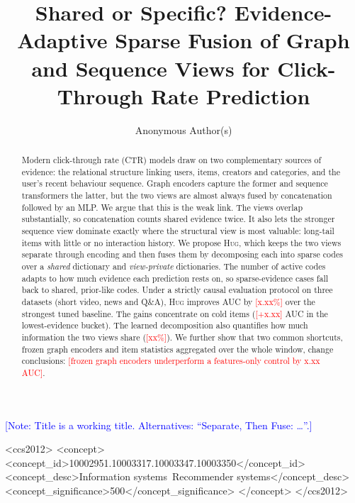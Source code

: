\documentclass[sigconf,anonymous,review]{acmart}
\newif\ifshownotes \shownotestrue
\newcommand{\tbd}[1]{\textcolor{red}{[#1]}}
\newcommand{\note}[1]{\ifshownotes\textcolor{blue}{[Note: #1]}\fi}
\newcommand{\method}{\textsc{Hug}}      %
\begin{document}
\title{Shared or Specific? Evidence-Adaptive Sparse Fusion of Graph and Sequence Views for Click-Through Rate Prediction}
\note{Title is a working title. Alternatives: ``Separate, Then Fuse: \dots''.}

\author{Anonymous Author(s)}

\begin{abstract}
Modern click-through rate (CTR) models draw on two complementary sources of
evidence: the relational structure linking users, items, creators and
categories, and the user's recent behaviour sequence. Graph encoders capture
the former and sequence transformers the latter, but the two views are almost
always fused by concatenation followed by an MLP. We argue that this is the
weak link. The views overlap substantially, so concatenation counts shared
evidence twice. It also lets the stronger sequence view dominate exactly
where the structural view is most valuable: long-tail items with little or no
interaction history. We propose \method{}, which keeps the two views separate
through encoding and then fuses them by decomposing each into sparse codes
over a \emph{shared} dictionary and \emph{view-private} dictionaries. The
number of active codes adapts to how much evidence each prediction rests on,
so sparse-evidence cases fall back to shared, prior-like codes. Under a
strictly causal evaluation protocol on three datasets (short video, news and
Q\&A), \method{} improves AUC by \tbd{x.xx\%} over the strongest tuned
baseline. The gains concentrate on cold items (\tbd{+x.xx} AUC in the
lowest-evidence bucket). The learned decomposition also quantifies how much
information the two views share (\tbd{xx\%}). We further show that two common
shortcuts, frozen graph encoders and item statistics aggregated over the whole
window, change conclusions: \tbd{frozen graph encoders underperform a
features-only control by x.xx AUC}.
\end{abstract}

\begin{CCSXML}
<ccs2012>
<concept>
<concept_id>10002951.10003317.10003347.10003350</concept_id>
<concept_desc>Information systems~Recommender systems</concept_desc>
<concept_significance>500</concept_significance>
</concept>
</ccs2012>
\end{CCSXML}

\end{document}
